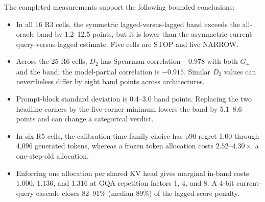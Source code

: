 The completed measurements support the following bounded conclusions:
\begin{itemize}
 \item In all 16 R3 cells, the symmetric lagged-versus-lagged band exceeds the
 all-oracle band by 1.2--12.5 points, but it is lower than the asymmetric
 current-query-versus-lagged estimate.  Five cells are STOP and five NARROW.
 \item Across the 25 R6 cells, $D_2$ has Spearman correlation $-0.978$ with both
 $G_+$ and the band; the model-partial correlation is $-0.915$.  Similar $D_2$
 values can nevertheless differ by eight band points across architectures.
 \item Prompt-block standard deviation is 0.4--3.0 band points.  Replacing the
 two headline corners by the five-corner minimum lowers the band by 5.1--8.6
 points and can change a categorical verdict.
 \item In six R5 cells, the calibration-time family choice has p90 regret 1.00
 through 4,096 generated tokens, whereas a frozen token allocation costs
 $2.52$--$4.30\times$ a one-step-old allocation.
 \item Enforcing one allocation per shared KV head gives marginal in-band costs
 $1.000$, $1.136$, and $1.316$ at GQA repetition factors 1, 4, and 8.  A 4-bit
 current-query cascade closes 82--91\% (median 89\%) of the lagged-score penalty.
\end{itemize}

\begin{table}[h]
\centering
\small
\caption{Predictor comparison on the 25 regime-map cells (\S\ref{sec:regimes}).  Columns: pooled Spearman correlation with $\gplus$; the same partialled on model identity; leave-one-model-out error of a log-linear fit of $\gplus$, as a multiplicative factor; mean Spearman within the held-out model.  All predictors are cell medians of per-head medians on the rows that define $D_2$; the recomputed $D_2$ matches the reported one to within 0.52 points in every cell.  The heterogeneity statistic is the spread of $\tfrac12\log_2 w_i$; for log-normal $w$ it ranks cells as the AM/GM ratio does.}
\label{tab:app-predictors}

\end{table}

